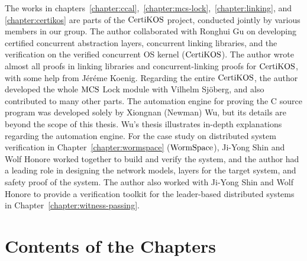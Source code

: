 The works in chapters~\ref{chapter:ccal},~\ref{chapter:mcs-lock},~\ref{chapter:linking}, and \ref{chapter:certikos}  are parts of the $\mathrm{CertiKOS}$ project,
conducted jointly by various members in our group. 
The author collaborated with Ronghui Gu on developing  certified  concurrent abstraction layers, concurrent linking libraries, and the verification on the verified concurrent OS kernel ($\mathrm{CertiKOS}$). 
The author wrote almost all proofs in linking libraries and concurrent-linking proofs for $\mathrm{CertiKOS}$, with some help from J{\'e}r{\'e}me Koenig. 
Regarding the entire $\mathrm{CertiKOS}$, the author developed the whole $\mathrm{MCS}$ Lock module with Vilhelm Sj{\"o}berg, 
and also contributed to many other parts. 
The automation engine for proving the C source program was developed solely by Xiongnan (Newman) Wu, but its details are beyond the scope of this thesis. 
Wu’s thesis illustrates in-depth explanations regarding the automation engine. 
For the case study on distributed system verification in Chapter~\ref{chapter:wormspace} ($\mathrm{WormSpace}$), Ji-Yong Shin and Wolf Honore worked together to build and verify the system, 
and the author had a leading role in designing the network models, layers for the target system, and safety proof of the system. 
The author also worked with Ji-Yong Shin and Wolf Honore to provide a verification toolkit for the leader-based distributed systems in  Chapter~\ref{chapter:witness-passing}.


\section{Contents of the Chapters}
\label{chapter:introduction:sec:contents-of-the-chapters}

